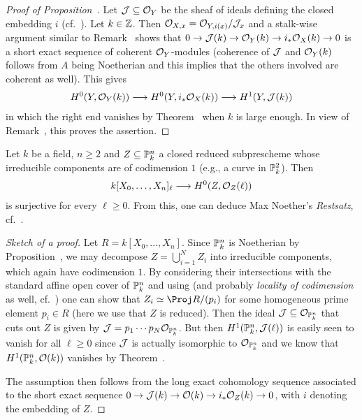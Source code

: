 \documentclass[a4paper,parskip=half,numbers=enddot, DIV=12]{scrreprt}
\begin{document}
\begin{proof}[Proof of Proposition~]
	Let $\mathcal{J}\subseteq \mathcal{O}_Y$ be the sheaf of ideals defining the closed embedding $i$ (cf.\ \cite[Corollary~1.5.3]{alggeo1}). Let $k\in\mathbb{Z}$. Then $\mathcal{O}_{X,x}=\mathcal{O}_{Y,i(x)}/\mathcal{J}_x$ and a stalk-wise argument similar to Remark~ shows that $0\morphism \Jj(k)\morphism \Oo_Y(k)\morphism i_*\Oo_X(k)\morphism 0$ is a short exact sequence of coherent $\mathcal{O}_Y$-modules (coherence of $\mathcal{J}$ and $\mathcal{O}_Y(k)$ follows from $A$ being Noetherian and this implies that the others involved are coherent as well). This gives
	\begin{align*}
		H^0(Y,\Oo_Y(k))\morphism H^0(Y,i_*\Oo_X(k))\morphism H^1(Y,\Jj(k))
	\end{align*}
	in which the right end vanishes by Theorem~ when $k$ is large enough. In view of Remark~, this proves the assertion.
\end{proof}
\begin{exc}
	Let $k$ be a field, $n\geq 2$ and $Z\subseteq \mathbb{P}_k^n$ a closed reduced subprescheme whose irreducible components are of codimension $1$ (e.g., a curve in $\mathbb{P}_k^2$). Then
	\begin{align*}
		k[X_0,\ldots,X_n]_\ell\morphism H^0(Z,\Oo_Z(\ell))
	\end{align*}
	is surjective for every $\ell\geq 0$. From this, one can deduce Max Noether's \emph{Restsatz}, cf.\ \cite[Theorem~23]{alg2}.
\end{exc}
\begin{proof}[Sketch of a proof]
	Let $R=k[X_0,\ldots,X_n]$. Since $\mathbb{P}_k^n$ is Noetherian by Proposition~, we may decompose $Z=\bigcup_{i=1}^NZ_i$ into irreducible components, which again have codimension $1$. By considering their intersections with the standard affine open cover of $\mathbb{P}_k^n$ and using \cite[Proposition~2.1.3]{alg1} (and probably \emph{locality of codimension} as well, cf.\ \cite[Remark~2.1.3]{alg1}) one can show that $Z_i\simeq \Proj R/(p_i)$ for some homogeneous prime element $p_i\in R$ (here we use that $Z$ is reduced). Then the ideal $\mathcal{J}\subseteq \mathcal{O}_{\mathbb{P}_k^n}$ that cuts out $Z$ is given by $\mathcal{J}=p_1\cdots p_N\mathcal{O}_{\mathbb{P}_k^n}$. But then $H^1(\mathbb{P}_k^n,\mathcal{J}(\ell))$ is easily seen to vanish for all $\ell\geq 0$ since $\mathcal{J}$ is actually isomorphic to $\mathcal{O}_{\mathbb{P}_k^n}$ and we know that $H^1(\mathbb{P}_k^n,\mathcal{O}(k))$ vanishes by Theorem~. 
	
	The assumption then follows from the long exact cohomology sequence associated to the short exact sequence $0\morphism \Jj(k)\morphism \Oo(k)\morphism i_*\Oo_Z(k)\morphism 0$, with $i$ denoting the embedding of $Z$.
\end{proof}
\end{document}
